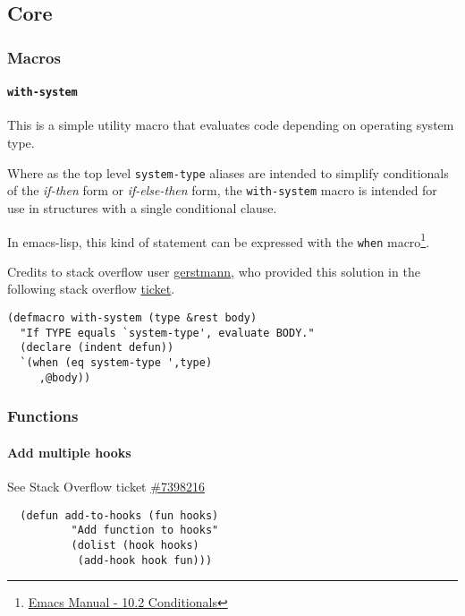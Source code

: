 \documentclass[11pt]{article}
\begin{document}
\subsection*{Core}
\label{sec:orgb030dfb}
\subsubsection*{Macros}
\label{sec:org9bb61d1}
\paragraph*{\texttt{with-system}}
\label{sec:org24d2e92}

This is a simple utility macro that evaluates code depending on
operating system type.

Where as the top level \texttt{system-type} aliases are intended to simplify
conditionals of the \emph{if-then} form or \emph{if-else-then} form, the
\texttt{with-system} macro is intended for use in structures with a single
conditional clause.

In emacs-lisp, this kind of statement can be expressed with the \texttt{when}
macro\footnote{\href{https://www.gnu.org/software/emacs/manual/html\_node/elisp/Conditionals.html}{Emacs Manual - 10.2 Conditionals}}.

Credits to stack overflow user \href{https://stackoverflow.com/users/403018/gerstmann}{gerstmann}, who provided this solution
in the following stack overflow \href{https://stackoverflow.com/a/26137517/6233622}{ticket}.

\begin{verbatim}
(defmacro with-system (type &rest body)
  "If TYPE equals `system-type', evaluate BODY."
  (declare (indent defun))
  `(when (eq system-type ',type)
     ,@body))
\end{verbatim}

\subsubsection*{Functions}
\label{sec:org4410ca7}
\paragraph*{Add multiple hooks}
\label{sec:org461b0f5}

See Stack Overflow ticket \href{https://stackoverflow.com/a/7400476/6233622}{\#7398216}

\begin{verbatim}
  (defun add-to-hooks (fun hooks)
          "Add function to hooks"
          (dolist (hook hooks)
           (add-hook hook fun)))
\end{verbatim}
\end{document}
